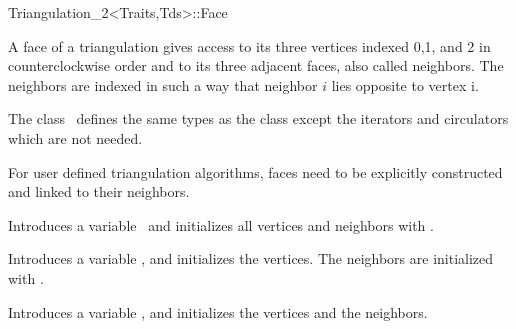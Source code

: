 

\begin{ccRefClass}{Triangulation_2<Traits,Tds>::Face}  %


\ccDefinition
  
A face of a triangulation gives access to its three
vertices indexed 0,1, and 2 in counterclockwise order
and to its three adjacent faces, also called neighbors.
The neighbors are indexed in such a way that neighbor $i$ lies
opposite to vertex i. 




\ccTypes
The class  \ccRefName\  defines the same types 
as the class  except the iterators and circulators
which are not needed.

\begin{ccAdvanced}
\ccCreation

For user defined triangulation algorithms, faces need to
be explicitly constructed and linked to their neighbors.

{Introduces a variable \ccVar\ and initializes all vertices and neighbors 
 with .}

{Introduces a variable \ccVar, and initializes the vertices. The 
neighbors are initialized with .}

{Introduces a variable \ccVar, and initializes the vertices and the neighbors.}




\end{ccAdvanced}
\end{ccRefClass}
